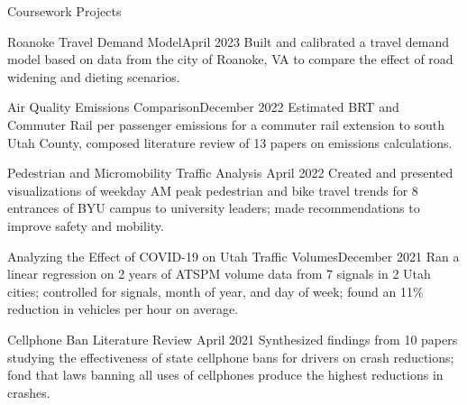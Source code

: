 \documentclass{resume} %
\begin{document}
\begin{rSection}{Coursework Projects}
\begin{pSubsection}{Roanoke Travel Demand Model}{April 2023}
{Built and calibrated a travel demand model based on data from the city of Roanoke, VA to compare the effect of road widening and dieting scenarios. }
\end{pSubsection}


\begin{pSubsection}{Air Quality Emissions Comparison}{December 2022}
{Estimated BRT and Commuter Rail per passenger emissions for a commuter rail extension to south Utah County, composed literature review of 13 papers on emissions calculations.}
\end{pSubsection}


\begin{pSubsection}{Pedestrian and Micromobility Traffic Analysis} {April 2022}
{Created and presented visualizations of weekday AM peak pedestrian and bike travel trends for 8 entrances of BYU campus to university leaders; made recommendations to improve safety and mobility.}
\end{pSubsection}


\begin{pSubsection}{Analyzing the Effect of COVID-19 on Utah Traffic Volumes}{December 2021}
{Ran a linear regression on 2 years of ATSPM volume data from 7 signals in 2 Utah cities; controlled for signals, month of year, and day of week; found an 11\% reduction in vehicles per hour on average.}
\end{pSubsection}


\begin{pSubsection}{Cellphone Ban Literature Review} {April 2021}
{Synthesized findings from 10 papers studying the effectiveness of state cellphone bans for drivers on crash reductions; fond that laws banning all uses of cellphones produce the highest reductions in crashes.}
\end{pSubsection}
\end{rSection}

\end{document}
